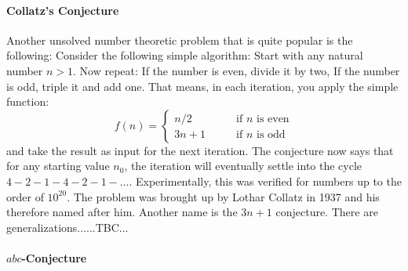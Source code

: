 

\paragraph{Collatz's Conjecture}
Another unsolved number theoretic problem that is quite popular is the following: Consider the following simple algorithm: Start with any natural number $n > 1$. Now repeat: If the number is even, divide it by two, If the number is odd, triple it and add one. That means, in each iteration, you apply the simple function:
\begin{equation}
f(n) = \begin{cases}
n/2    \qquad & \text{if $n$ is even}  \\
3n + 1 \qquad & \text{if $n$ is odd}
\end{cases}
\end{equation}
and take the result as input for the next iteration. The conjecture now says that for any starting value $n_0$, the iteration will eventually settle into the cycle $4-2-1-4-2-1-\ldots$. Experimentally, this was verified for numbers up to the order of $10^{20}$. The problem was brought up by Lothar Collatz in 1937 and his therefore named after him. Another name is the $3n + 1$ conjecture. There are generalizations......TBC...




\paragraph{$abc$-Conjecture}



